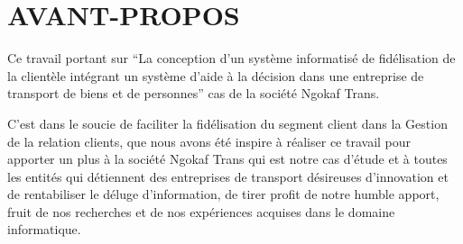 \chapter*{AVANT-PROPOS}
Ce travail portant sur \enquote{La conception d’un système informatisé de fidélisation
de la clientèle intégrant un système d’aide à la décision dans une entreprise de transport
de biens et de personnes} cas de la société Ngokaf Trans.
\par
C’est dans le soucie de faciliter la fidélisation du segment client
dans la Gestion de la relation clients, que nous avons été inspire
à réaliser ce travail pour apporter un plus à la société Ngokaf Trans
qui est notre cas d’étude et à toutes les entités qui détiennent des entreprises
de transport désireuses d’innovation et de rentabiliser le 
déluge d’information, de tirer profit de notre humble apport, fruit
de nos recherches et de nos expériences acquises dans le domaine informatique.